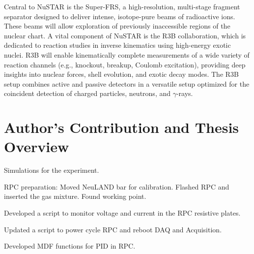 \begin{itemize}
	Central to NuSTAR is the Super-FRS, a high-resolution, multi-stage fragment separator designed to deliver intense, isotope-pure beams of radioactive ions. These beams will allow exploration of previously inaccessible regions of the nuclear chart. A vital component of NuSTAR is the \gls{R3B} collaboration, which is dedicated to reaction studies in inverse kinematics using high-energy exotic nuclei. \gls{R3B} will enable kinematically complete measurements of a wide variety of reaction channels (e.g., knockout, breakup, Coulomb excitation), providing deep insights into nuclear forces, shell evolution, and exotic decay modes. The \gls{R3B} setup combines active and passive detectors in a versatile setup optimized for the coincident detection of charged particles, neutrons, and $\gamma$-rays.
\end{itemize}




\section{Author's Contribution and Thesis Overview}


Simulations for the experiment.

RPC preparation:
Moved NeuLAND bar for calibration. Flashed RPC and inserted the gas mixture. Found working point.

Developed a script to monitor voltage and current in the RPC resistive plates.

Updated a script to power cycle RPC and reboot DAQ and Acquisition.

Developed MDF functions for PID in RPC.